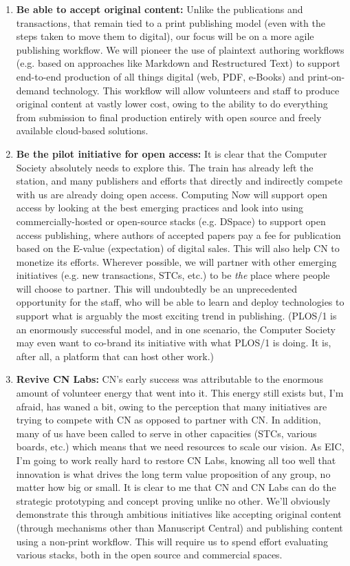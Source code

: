 \documentclass[11pt,english]{luclet}
\begin{document}
\begin{enumerate}

\item \textbf{Be able to accept original content:} Unlike the publications and
  transactions, that remain tied to a print publishing model (even
  with the steps taken to move them to digital), our focus will be on
  a more agile publishing workflow. We will pioneer the use of
  plaintext authoring workflows (e.g. based on approaches like
  Markdown and Restructured Text) to support end-to-end production of
  all things digital (web, PDF, e-Books) and print-on-demand
  technology. This workflow will allow volunteers and staff to produce
  original content at vastly lower cost, owing to the ability to do
  everything from submission to final production entirely with open
  source and freely available cloud-based solutions. 

\item \textbf{Be the pilot initiative for open access:} It is clear that the
  Computer Society absolutely needs to explore this. The train has
  already left the station, and many publishers and efforts that
  directly and indirectly compete with us are already doing open
  access. Computing Now will support open access by looking at the
  best emerging practices and look into using commercially-hosted or
  open-source stacks (e.g. DSpace) to support open access publishing,
  where authors of accepted papers pay a fee for publication based on
  the E-value (expectation) of digital sales.  This will also help CN
  to monetize its efforts. Wherever possible, we will partner with
  other emerging initiatives (e.g. new transactions, STCs, etc.) to be
  \emph{the} place where people will choose to partner. This will
  undoubtedly be an unprecedented opportunity for the staff, who will
  be able to learn and deploy technologies to support what is arguably
  the most exciting trend in publishing. (PLOS/1 is an enormously
  successful model, and in one scenario, the Computer Society may even
  want to co-brand its initiative with what PLOS/1 is doing. It is,
  after all, a platform that can host other work.)

\item \textbf{Revive CN Labs:} CN's early success was attributable to the
  enormous amount of volunteer energy that went into it. This energy
  still exists but, I'm afraid, has waned a bit, owing to the
  perception that many initiatives are trying to compete with CN as
  opposed to partner with CN. In addition, many of us have been called
  to serve in other capacities (STCs, various boards, etc.) which
  means that we need resources to scale our vision. As EIC, I'm going
  to work really hard to restore CN Labs, knowing all too well that
  innovation is what drives the long term value proposition of any
  group, no matter how big or small. It is clear to me that CN and CN
  Labs can do the strategic prototyping and concept proving unlike no
  other. We'll obviously demonstrate this through ambitious
  initiatives like accepting original content (through mechanisms
  other than Manuscript Central) and publishing content using a
  non-print workflow.  This will require us to spend effort evaluating
  various stacks, both in the open source and commercial spaces.


\end{enumerate}
\end{document}
